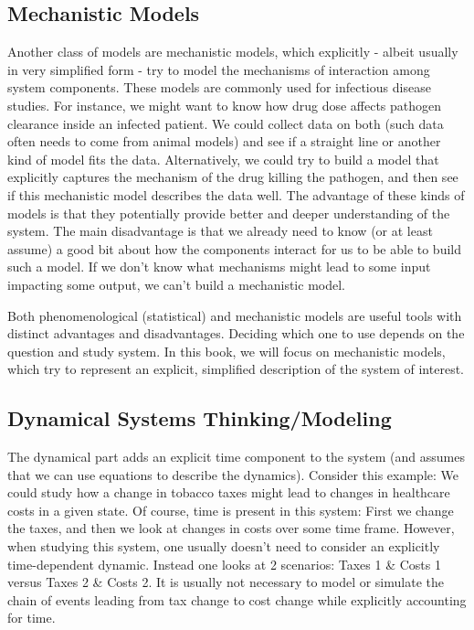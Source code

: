 \documentclass[]{book}
\theoremstyle{definition}
\theoremstyle{definition}
\theoremstyle{definition}
\theoremstyle{remark}
\begin{document}
\subsection{Mechanistic Models}\label{mechanistic-models}

Another class of models are mechanistic models, which explicitly -
albeit usually in very simplified form - try to model the mechanisms of
interaction among system components. These models are commonly used for
infectious disease studies. For instance, we might want to know how drug
dose affects pathogen clearance inside an infected patient. We could
collect data on both (such data often needs to come from animal models)
and see if a straight line or another kind of model fits the data.
Alternatively, we could try to build a model that explicitly captures
the mechanism of the drug killing the pathogen, and then see if this
mechanistic model describes the data well. The advantage of these kinds
of models is that they potentially provide better and deeper
understanding of the system. The main disadvantage is that we already
need to know (or at least assume) a good bit about how the components
interact for us to be able to build such a model. If we don't know what
mechanisms might lead to some input impacting some output, we can't
build a mechanistic model.

Both phenomenological (statistical) and mechanistic models are useful
tools with distinct advantages and disadvantages. Deciding which one to
use depends on the question and study system. In this book, we will
focus on mechanistic models, which try to represent an explicit,
simplified description of the system of interest.

\subsection{Dynamical Systems
Thinking/Modeling}\label{dynamical-systems-thinkingmodeling}

The dynamical part adds an explicit time component to the system (and
assumes that we can use equations to describe the dynamics). Consider
this example: We could study how a change in tobacco taxes might lead to
changes in healthcare costs in a given state. Of course, time is present
in this system: First we change the taxes, and then we look at changes
in costs over some time frame. However, when studying this system, one
usually doesn't need to consider an explicitly time-dependent dynamic.
Instead one looks at 2 scenarios: Taxes 1 \& Costs 1 versus Taxes 2 \&
Costs 2. It is usually not necessary to model or simulate the chain of
events leading from tax change to cost change while explicitly
accounting for time.
\end{document}
